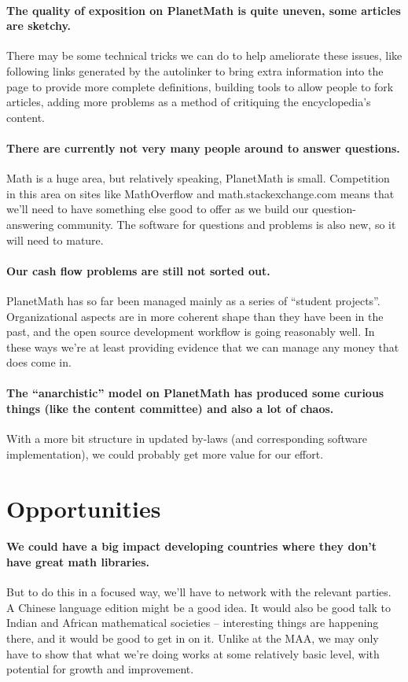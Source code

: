 \paragraph{The quality of exposition on PlanetMath is quite uneven, some
  articles are sketchy.}  There may be some technical tricks we can do
to help ameliorate these issues, like following links generated by the
autolinker to bring extra information into the page to provide more
complete definitions, building tools to allow people to fork articles,
adding more problems as a method of critiquing the encyclopedia's
content.

\paragraph{There are currently not very many people around to answer
  questions.}  Math is a huge area, but relatively speaking,
PlanetMath is small.  Competition in this area on sites like
MathOverflow and math.stackexchange.com means that we'll need to have
something else good to offer as we build our question-answering
community.  The software for questions and problems is also new, so it
will need to mature.

\paragraph{Our cash flow problems are still not sorted out.}  PlanetMath has
so far been managed mainly as a series of ``student projects''.
Organizational aspects are in more coherent shape than they have been
in the past, and the open source development workflow is going
reasonably well.  In these ways we're at least providing evidence that
we can manage any money that does come in.

\paragraph{The ``anarchistic'' model on PlanetMath has produced some curious
  things (like the content committee) and also a lot of chaos.}  With
a more bit structure in updated by-laws (and corresponding software
implementation), we could probably get more value for our effort.

\section*{Opportunities}

\paragraph{We could have a big impact developing countries where they don't
  have great math libraries.}  But to do this in a focused way, we'll
have to network with the relevant parties.  A Chinese language edition
might be a good idea.  It would also be good talk to Indian and
African mathematical societies -- interesting things are happening
there, and it would be good to get in on it.  Unlike at the MAA, we
may only have to show that what we're doing works at some relatively
basic level, with potential for growth and improvement.

